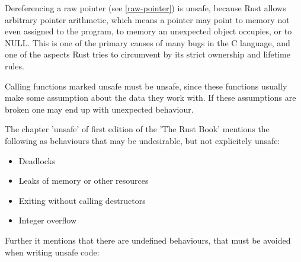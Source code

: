 \documentclass[twocolumn]{article}
\begin{document}
Dereferencing a raw pointer (see \ref{raw-pointer}) is unsafe, because Rust allows arbitrary pointer arithmetic, which means a pointer may point to memory not even assigned to the program, to memory an unexpected object occupies, or to NULL. This is one of the primary causes of many bugs in the C language, and one of the aspects Rust tries to circumvent by its strict ownership and lifetime rules.

Calling functions marked unsafe must be unsafe, since these functions usually make some assumption about the data they work with. If these assumptions are broken one may end up with unexpected behaviour.

The chapter 'unsafe' of first edition of the 'The Rust Book'\cite{RustBook-Unsafe} mentions the following as behaviours that may be undesirable, but not explicitely unsafe:
\begin{itemize}
        \item Deadlocks
        \item Leaks of memory or other resources
        \item Exiting without calling destructors
        \item Integer overflow
\end{itemize}
Further it mentions that there are undefined behaviours, that must be avoided when writing unsafe code:
\end{document}
